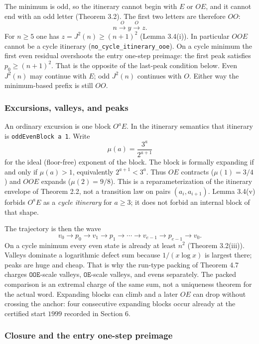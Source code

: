 \documentclass[12pt]{article}
\begin{document}
The minimum is odd, so the itinerary cannot begin with \(E\) or \(OE\),
and it cannot end with an odd letter (Theorem 3.2). The first two
letters are therefore \(OO\): \[
n\overset{O}{\longrightarrow}y\overset{O}{\longrightarrow}z.
\] For \(n\ge 5\) one has \(z=J^2(n)\ge(n+1)^2\) (Lemma 3.4(i)). In
particular \(OOE\) cannot be a cycle itinerary
(\texttt{\nolinkurl{no_cycle_itinerary_ooe}}). On a cycle minimum the
first even residual overshoots the entry one-step preimage: the first
peak satisfies \(p_0\ge(n+1)^2\). That is the opposite of the last-peak
condition below. Even \(J^2(n)\) may continue with \(E\); odd \(J^2(n)\)
continues with \(O\). Either way the minimum-based prefix is still
\(OO\).

\subsubsection{Excursions, valleys, and
peaks}\label{excursions-valleys-and-peaks}

An ordinary excursion is one block \(O^{a}E\). In the itinerary
semantics that itinerary is \texttt{oddEvenBlock\ a\ 1}. Write \[
\mu(a)=\frac{3^a}{2^{a+1}}
\] for the ideal (floor-free) exponent of the block. The block is
formally expanding if and only if \(\mu(a)>1\), equivalently
\(2^{a+1}<3^a\). Thus \(OE\) contracts (\(\mu(1)=3/4\)) and \(OOE\)
expands (\(\mu(2)=9/8\)). This is a reparameterization of the itinerary
envelope of Theorem 2.2, not a transition law on pairs
\((a_i,a_{i+1})\). Lemma 3.4(v) forbids \(O^aE\) as a \emph{cycle
itinerary} for \(a\ge 3\); it does not forbid an internal block of that
shape.

The trajectory is then the wave \[
v_0\to p_0\to v_1\to p_1\to\cdots\to v_{e-1}\to p_{e-1}\to v_0.
\] On a cycle minimum every even state is already at least \(n^2\)
(Theorem 3.2(iii)). Valleys dominate a logarithmic defect sum because
\(1/(x\log x)\) is largest there; peaks are huge and cheap. That is why
the run-type packing of Theorem 4.7 charges \(\mathtt{OOE}\)-scale
valleys, \(\mathtt{OE}\)-scale valleys, and evens separately. The packed
comparison is an extremal charge of the same sum, not a uniqueness
theorem for the actual word. Expanding blocks can climb and a later
\(OE\) can drop without crossing the anchor: four consecutive expanding
blocks occur already at the certified start \(1999\) recorded in Section
6.

\subsubsection{Closure and the entry one-step
preimage}\label{closure-and-the-entry-one-step-preimage}
\end{document}
